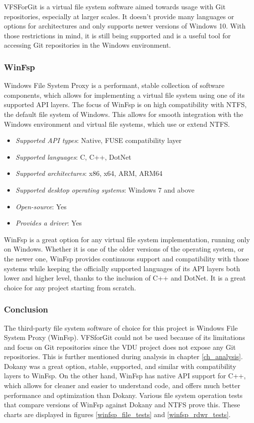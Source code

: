 VFSForGit is a virtual file system software aimed towards usage with Git repositories, especially at larger scales. It doesn't provide many languages or options for architectures and only supports newer versions of Windows 10. With those restrictions in mind, it is still being supported and is a useful tool for accessing Git repositories in the Windows environment.\cite{GitVfsForGit}\cite{VfsForGitMS}

\subsubsection{WinFsp}
Windows File System Proxy is a performant, stable collection of software components, which allows for implementing a virtual file system using one of its supported API layers. The focus of WinFsp is on high compatibility with NTFS, the default file system of Windows. This allows for smooth integration with the Windows environment and virtual file systems, which use or extend NTFS.

\begin{itemize}
    \item \textit{Supported API types}: Native, FUSE compatibility layer
    \item \textit{Supported languages}: C, C++, DotNet
    \item \textit{Supported architectures}: x86, x64, ARM, ARM64
    \item \textit{Supported desktop operating systems}: Windows 7 and above
    \item \textit{Open-source}: Yes
    \item \textit{Provides a driver}: Yes
\end{itemize}

WinFsp is a great option for any virtual file system implementation, running only on Windows. Whether it is one of the older versions of the operating system, or the newer one, WinFsp provides continuous support and compatibility with those systems while keeping the officially supported languages of its API layers both lower and higher level, thanks to the inclusion of C++ and DotNet. It is a great choice for any project starting from scratch.\cite{GitWinFsp}

\subsubsection{Conclusion}
The third-party file system software of choice for this project is Windows File System Proxy (WinFsp). VFSforGit could not be used because of its limitations and focus on Git repositories since the VDU project does not expose any Git repositories. This is further mentioned during analysis in chapter \ref{ch_analysis}. Dokany was a great option, stable, supported, and similar with compatibility layers to WinFsp. On the other hand, WinFsp has native API support for C++, which allows for cleaner and easier to understand code, and offers much better performance and optimization than Dokany. Various file system operation tests that compare versions of WinFsp against Dokany and NTFS prove this. These charts are displayed in figures \ref{winfsp_file_tests} and \ref{winfsp_rdwr_tests}.

